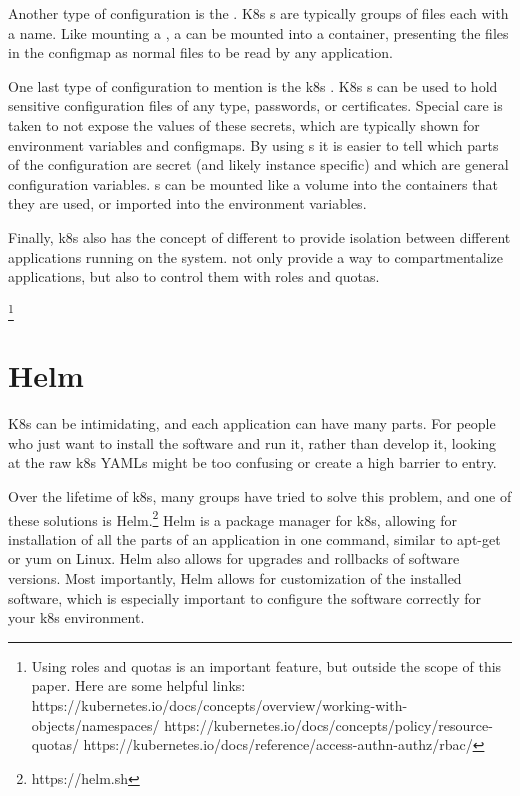 \documentclass[11pt,twoside]{article}
\begin{document}
Another type of configuration is the .  K8s s are typically
groups of files each with a name.  Like mounting a , a 
can be mounted into a container, presenting the files in the configmap as normal files to be
read by any application.

One last type of configuration to mention is the k8s .  K8s s can
be used to hold sensitive configuration files of any type, passwords, or certificates.  Special
care is taken to not expose the values of these secrets, which are typically shown for
environment variables and configmaps.  By using s it is easier to tell which
parts of the configuration are secret (and likely instance specific) and which are general
configuration variables.  s can be mounted like a volume into the containers
that they are used, or imported into the environment variables.

Finally, k8s also has the concept of different  to provide isolation between
different applications running on the system.   not only provide a way to
compartmentalize applications, but also to control them with roles and quotas.

\footnote{Using roles and quotas is an important feature, but outside the scope of this paper.  Here are some helpful links:
https://kubernetes.io/docs/concepts/overview/working-with-objects/namespaces/
https://kubernetes.io/docs/concepts/policy/resource-quotas/ https://kubernetes.io/docs/reference/access-authn-authz/rbac/}

\section{Helm}

K8s can be intimidating, and each application can have many parts.  For people who just
want to install the software and run it, rather than develop it, looking at the raw
k8s YAMLs might be too confusing or create a high barrier to entry.

Over the lifetime of k8s, many groups have tried to solve this problem, and one of these
solutions is Helm.\footnote{https://helm.sh}  Helm is a package manager for k8s, allowing
for installation of all the parts of an application in one command, similar to apt-get
or yum on Linux.  Helm also allows for upgrades and rollbacks of software versions.
Most importantly, Helm allows for customization of the installed software, which is
especially important to configure the software correctly for your k8s environment.
\end{document}
